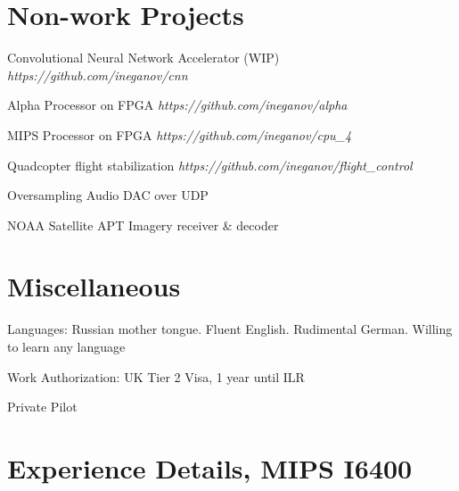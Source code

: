\documentclass[a4paper]{scrartcl}
\begin{document}
\vspace{10pt}

\section*{Non-work Projects}
\begin{list1}
\item
  \begin{list2}
    \item Convolutional Neural Network Accelerator (WIP)                    \hfill \emph{https://github.com/ineganov/cnn}
    \item Alpha Processor on FPGA                                           \hfill \emph{https://github.com/ineganov/alpha}
    \item MIPS Processor on FPGA                                            \hfill \emph{https://github.com/ineganov/cpu\_4}
    \item Quadcopter flight stabilization                                   \hfill \emph{https://github.com/ineganov/flight\_control}
    \item Oversampling Audio DAC over UDP
    \item NOAA Satellite APT Imagery receiver \& decoder
  \end{list2}
\end{list1}

\vspace{10pt}

\section*{Miscellaneous}
\begin{list1}
\item
  \begin{list2}
  \item Languages: Russian mother tongue. Fluent English. Rudimental German. Willing to learn any language
  \item Work Authorization: UK Tier 2 Visa, 1 year until ILR
  \item Private Pilot
  \end{list2}
\end{list1}

\newpage

\section*{Experience Details, MIPS I6400}
\end{document}
